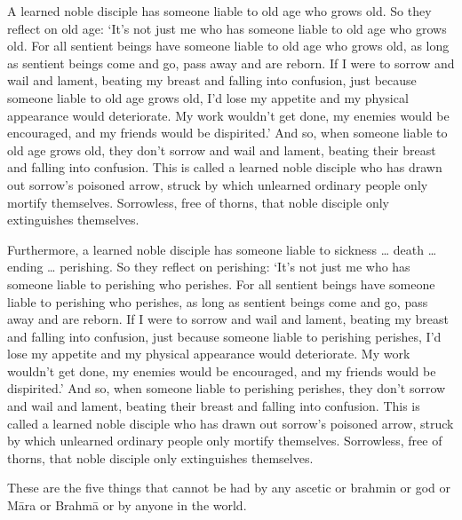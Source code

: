 \documentclass[12pt,openany]{book}%
\begin{document}
A learned noble disciple has someone liable to old age who grows old. So they reflect on old age: ‘It’s not just me who has someone liable to old age who grows old. For all sentient beings have someone liable to old age who grows old, as long as sentient beings come and go, pass away and are reborn. If I were to sorrow and wail and lament, beating my breast and falling into confusion, just because someone liable to old age grows old, I’d lose my appetite and my physical appearance would deteriorate. My work wouldn’t get done, my enemies would be encouraged, and my friends would be dispirited.’ And so, when someone liable to old age grows old, they don’t sorrow and wail and lament, beating their breast and falling into confusion. This is called a learned noble disciple who has drawn out sorrow’s poisoned arrow, struck by which unlearned ordinary people only mortify themselves. Sorrowless, free of thorns, that noble disciple only extinguishes themselves. 

Furthermore, a learned noble disciple has someone liable to sickness … death … ending … perishing. So they reflect on perishing: ‘It’s not just me who has someone liable to perishing who perishes. For all sentient beings have someone liable to perishing who perishes, as long as sentient beings come and go, pass away and are reborn. If I were to sorrow and wail and lament, beating my breast and falling into confusion, just because someone liable to perishing perishes, I’d lose my appetite and my physical appearance would deteriorate. My work wouldn’t get done, my enemies would be encouraged, and my friends would be dispirited.’ And so, when someone liable to perishing perishes, they don’t sorrow and wail and lament, beating their breast and falling into confusion. This is called a learned noble disciple who has drawn out sorrow’s poisoned arrow, struck by which unlearned ordinary people only mortify themselves. Sorrowless, free of thorns, that noble disciple only extinguishes themselves. 

These are the five things that cannot be had by any ascetic or brahmin or god or \textsanskrit{Māra} or \textsanskrit{Brahmā} or by anyone in the world. 
\end{document}
